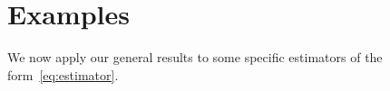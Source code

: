 \documentclass[bj]{imsart}
\newcommand{\normtwo}[1]{\ensuremath{\!|\!| #1 | \! |_{2}}}
\newcommand{\1}{{\rm 1}\mskip -4,5mu{\rm l} }
\def\R{\mathbb{R}}
\begin{document}
%






\section{Examples}\label{sec:examples}
\newcommand\iid{\stackrel{\mathclap{\normalfont\mbox{\scriptsize iid}}}{\sim}}
We now apply our general results to some specific estimators of the form~\eqref{eq:estimator}. 
\end{document}
